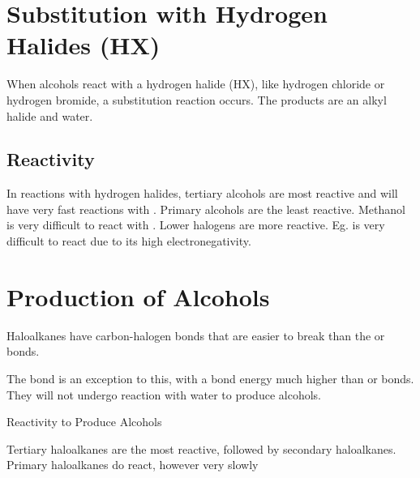	\begin{center}
	\end{center}

\section{Substitution with Hydrogen Halides (HX)}

	When alcohols react with a hydrogen halide (HX), like hydrogen chloride or hydrogen bromide, a substitution reaction occurs. The products are an alkyl halide and water.

	\begin{center}
	\end{center}

	\subsection{Reactivity}
	
		In reactions with hydrogen halides, tertiary alcohols are most reactive and will have very fast reactions with . Primary alcohols are the least reactive. Methanol is very difficult to react with . Lower halogens are more reactive. Eg.  is very difficult to react due to its high electronegativity.

\section{Production of Alcohols}
	\begin{center}
	\end{center}

	\begin{center}
	\end{center}

	Haloalkanes have carbon-halogen bonds that are easier to break than the  or  bonds.

	The  bond is an exception to this, with a bond energy much higher than  or  bonds. They will not undergo reaction with water to produce alcohols.

	Reactivity to Produce Alcohols

	Tertiary haloalkanes are the most reactive, followed by secondary haloalkanes. Primary haloalkanes do react, however very slowly

